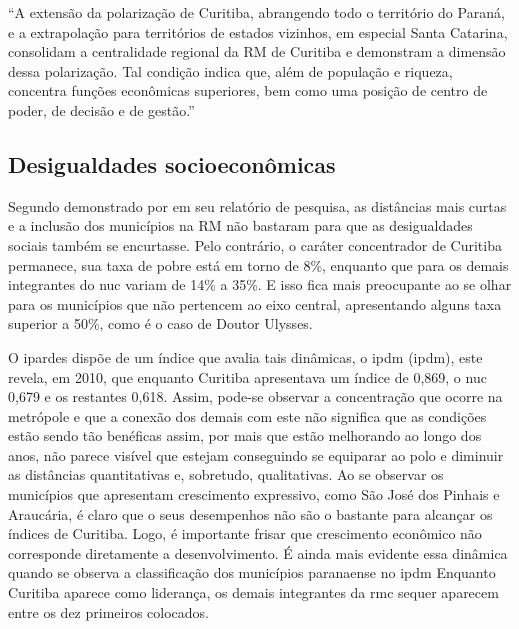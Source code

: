 	\begin{citacao}
		``A extensão da polarização de Curitiba, abrangendo todo o território do Paraná, e a extrapolação para territórios de estados vizinhos, em especial Santa Catarina, consolidam a centralidade regional da RM de Curitiba e demonstram a dimensão dessa polarização. Tal condição indica que, além de população e riqueza, concentra funções econômicas superiores, bem como uma posição de centro de poder, de decisão e de gestão.'' 
	\end{citacao}
	
	\subsection{Desigualdades socioeconômicas}
	
	Segundo demonstrado por  em seu relatório de pesquisa, as distâncias mais curtas e a inclusão dos municípios na RM não bastaram para que as desigualdades sociais também se encurtasse. Pelo contrário, o caráter concentrador de Curitiba permanece, sua taxa de pobre está em torno de 8\%, enquanto que para os demais integrantes do \gls{nuc} variam de 14\% a 35\%. E isso fica mais preocupante ao se olhar para os municípios que não pertencem ao eixo central, apresentando alguns taxa superior a 50\%, como é o caso de Doutor Ulysses. 
	
	O \gls{ipardes} dispõe de um índice que avalia tais dinâmicas, o \gls{ipdm} (\glsdesc{ipdm}), este revela, em 2010, que enquanto Curitiba apresentava um índice de 0,869, o \gls{nuc} 0,679 e os restantes 0,618. Assim, pode-se observar a concentração que ocorre na metrópole e que a conexão dos demais com este não significa que as condições estão sendo tão benéficas assim, por mais que estão melhorando ao longo dos anos, não parece visível que estejam conseguindo se equiparar ao polo e diminuir as distâncias quantitativas e, sobretudo, qualitativas. Ao se observar os municípios que apresentam crescimento expressivo, como São José dos Pinhais e Araucária, é claro que o seus desempenhos não são o bastante para alcançar os índices de Curitiba. Logo, é importante frisar que crescimento econômico não corresponde diretamente a desenvolvimento. É ainda mais evidente essa dinâmica quando se observa a classificação dos municípios paranaense no \gls{ipdm} Enquanto Curitiba aparece como liderança, os demais integrantes da \gls{rmc} sequer aparecem entre os dez primeiros colocados.
	
